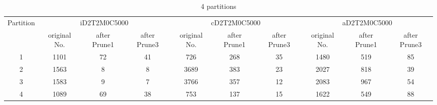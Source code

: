 \begin{table*}[t]
  \centering
\makeatletter
    \long{}
\makeatother
  \caption{4 partitions}
    \vspace*{3pt}
  \footnotesize

  \label{table:partition4}
  \begin{tabular}{|c||c|c|c|c|c|c|c|c|c|}
  \hline
  \multirow{2}{*}{Partition} &  \multicolumn{3}{|c|}{iD2T2M0C5000} & \multicolumn{3}{|c|}{cD2T2M0C5000} &\multicolumn{3}{|c|}{aD2T2M0C5000} \\\cline{2-10}
    &  original No. & after Prune1 & after Prune3 & original No. & after Prune1 & after Prune3 & original No. & after Prune1 & after Prune3\\\hline\hline

\cline{2-10}
    1 &  1101 & 72 & 41 & 726 & 268 & 35 & 1480 & 519 & 85 \\\hline

\cline{2-10}
    2 &  1563 & 8 & 8 & 3689 & 383 & 23 & 2027 & 818 & 39 \\\hline

\cline{2-10}
    3 &  1583 & 9 & 7 & 3766 & 357 & 12 & 2083 & 967 & 54 \\\hline
    
\cline{2-10}
    4 &  1089 & 69 & 38 & 753 & 137 & 15 & 1622 & 549 & 88 \\\hline
    
  \end{tabular}
  \vspace*{-17pt}
\end{table*}



